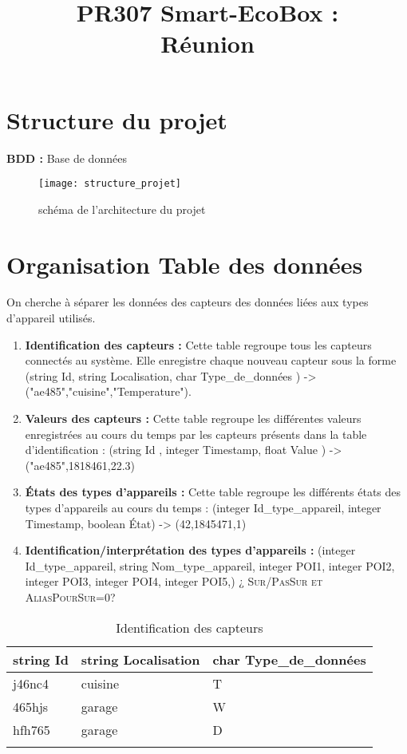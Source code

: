 \documentclass[10pt,a4paper]{article}
\title{PR307 Smart-EcoBox : \\ Réunion}
\begin{document}
\maketitle

\section {Structure du projet}
\textbf{BDD :} Base de données

\begin{figure}[h]
\centering
\texttt{[image: structure\_projet]}
\caption{schéma de l'architecture du projet}
\label{fig:my_label}
\end{figure}

\section{Organisation Table des données}

On cherche à séparer les données des capteurs des données liées aux types d'appareil utilisés.
\begin{enumerate}
\item \textbf{Identification des capteurs :} Cette table regroupe tous les capteurs connectés au système. Elle enregistre chaque nouveau capteur sous la forme (string Id, string Localisation, char Type\_de\_données ) -> ("ae485","cuisine","Temperature").
\item \textbf{Valeurs des capteurs :} Cette table regroupe les différentes valeurs enregistrées au cours 
du temps par les capteurs présents dans la table d'identification : (string Id , integer Timestamp, float Value ) -> ("ae485",1818461,22.3)
\item \textbf{États des types d'appareils : } Cette table regroupe les différents états des types d'appareils au cours du temps : (integer Id\_type\_appareil, integer Timestamp, boolean État) -> (42,1845471,1)
\item \textbf{Identification/interprétation des types d'appareils :} 
(integer Id\_type\_appareil, string Nom\_type\_appareil, integer POI1, integer POI2, integer POI3, integer POI4, integer POI5,) \textsc{¿ Sur/PasSur et AliasPourSur=0?}
\end{enumerate}

\begin{table}[h!]
    \centering
    \begin{tabular}{|l|l|l|}
    \hline
    \rowcolor[HTML]{EFEFEF} 
    string Id & string Localisation & char Type\_de\_données \\ \hline
    j46nc4    & cuisine             & T                      \\ \hline
    465hjs    & garage              & W                      \\ \hline
    hfh765    & garage              & D                      \\ \hline
              &                     &                       
    \end{tabular}
    \caption{Identification des capteurs}
\end{table}
\end{document}
